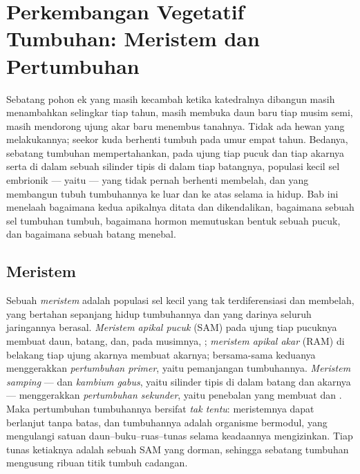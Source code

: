 \chapter{Perkembangan Vegetatif Tumbuhan: Meristem dan Pertumbuhan}\label{ch:b2:plant-meristems}

Sebatang pohon ek yang masih kecambah ketika katedralnya dibangun masih
menambahkan selingkar  tiap tahun, masih membuka daun baru tiap
musim semi, masih mendorong ujung akar baru menembus tanahnya. Tidak
ada hewan yang melakukannya; seekor kuda berhenti tumbuh pada umur
empat tahun. Bedanya, sebatang tumbuhan mempertahankan, pada ujung tiap
pucuk dan tiap akarnya serta di dalam sebuah silinder tipis di dalam
tiap batangnya, populasi kecil sel embrionik --- yaitu
\emph{} --- yang tidak pernah berhenti membelah, dan yang
membangun tubuh tumbuhannya ke luar dan ke atas selama ia hidup. Bab
ini menelaah bagaimana kedua  apikalnya ditata dan
dikendalikan, bagaimana sebuah sel tumbuhan tumbuh, bagaimana hormon
memutuskan bentuk sebuah pucuk, dan bagaimana sebuah batang menebal.

\section{Meristem}

\begin{definition}\label{def:b2:plant-meristems:meristem}
%
Sebuah \emph{meristem} adalah populasi sel kecil yang tak
terdiferensiasi dan membelah, yang bertahan sepanjang hidup tumbuhannya
dan yang darinya seluruh jaringannya berasal. \emph{Meristem apikal
pucuk} (SAM) pada ujung tiap pucuknya membuat daun, batang, dan, pada
musimnya, ; \emph{meristem apikal akar} (RAM) di belakang tiap
ujung akarnya membuat akarnya; bersama-sama keduanya menggerakkan
\emph{pertumbuhan primer}, yaitu pemanjangan tumbuhannya. \emph{Meristem
samping} --- \emph{} dan \emph{kambium gabus}, yaitu
silinder tipis di dalam batang dan akarnya --- menggerakkan
\emph{pertumbuhan sekunder}, yaitu penebalan yang membuat  dan
. Maka pertumbuhan tumbuhannya bersifat \emph{tak tentu}:
meristemnya dapat berlanjut tanpa batas, dan tumbuhannya adalah
organisme bermodul, yang mengulangi satuan daun--buku--ruas--tunas
selama keadaannya mengizinkan. Tiap tunas ketiaknya adalah sebuah SAM
yang dorman, sehingga sebatang tumbuhan mengusung ribuan titik tumbuh
cadangan.
\end{definition}


